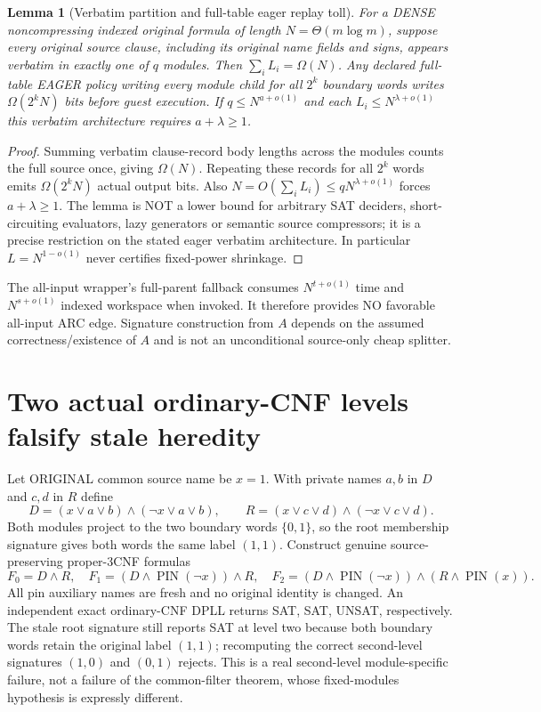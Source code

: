 \documentclass[11pt]{article}
\newtheorem{lemma}[theorem]{Lemma}
\begin{document}
\begin{lemma}[Verbatim partition and full-table eager replay toll]
For a DENSE noncompressing indexed original formula of length
$N=\Theta(m\log m)$, suppose every original source clause, including
its original name fields and signs, appears verbatim in exactly
one of $q$ modules. Then $\sum_i L_i=\Omega(N)$.
Any declared full-table EAGER policy writing every module child
for all $2^k$ boundary words writes $\Omega(2^kN)$ bits
before guest execution. If $q\le N^{a+o(1)}$ and each
$L_i\le N^{\lambda+o(1)}$ this verbatim architecture
requires $a+\lambda\ge1$.
\end{lemma}
\begin{proof}
Summing verbatim clause-record body lengths across the modules counts
the full source once, giving $\Omega(N)$. Repeating these records for
all $2^k$ words emits $\Omega(2^kN)$ actual output bits.
Also $N=O(\sum_iL_i)\le qN^{\lambda+o(1)}$ forces
$a+\lambda\ge1$. The lemma is NOT a lower bound for arbitrary SAT
deciders, short-circuiting evaluators, lazy generators or semantic
source compressors; it is a precise restriction on the stated eager
verbatim architecture. In particular $L=N^{1-o(1)}$ never certifies
fixed-power shrinkage.
\end{proof}
The all-input wrapper's full-parent fallback consumes
$N^{t+o(1)}$ time and $N^{s+o(1)}$ indexed workspace when invoked.
It therefore provides NO favorable all-input ARC edge. Signature
construction from $A$ depends on the assumed correctness/existence
of $A$ and is not an unconditional source-only cheap splitter.

\section{Two actual ordinary-CNF levels falsify stale heredity}
Let ORIGINAL common source name be $x=1$. With private names
$a,b$ in $D$ and $c,d$ in $R$ define
\[
D=(x\lor a\lor b)\land(\neg x\lor a\lor b),\qquad
R=(x\lor c\lor d)\land(\neg x\lor c\lor d).
\]
Both modules project to the two boundary words $\{0,1\}$,
so the root membership signature gives both words the same
label $(1,1)$. Construct genuine source-preserving proper-3CNF
formulas
\[
F_0=D\land R,\quad
F_1=(D\land\operatorname{PIN}(\neg x))\land R,\quad
F_2=(D\land\operatorname{PIN}(\neg x))
       \land(R\land\operatorname{PIN}(x)).
\]
All pin auxiliary names are fresh and no original identity
is changed. An independent exact ordinary-CNF DPLL returns
SAT, SAT, UNSAT, respectively. The stale root signature
still reports SAT at level two because both boundary words
retain the original label $(1,1)$; recomputing the correct
second-level signatures $(1,0)$ and $(0,1)$ rejects.
This is a real second-level module-specific failure, not a
failure of the common-filter theorem, whose fixed-modules
hypothesis is expressly different.
\end{document}

